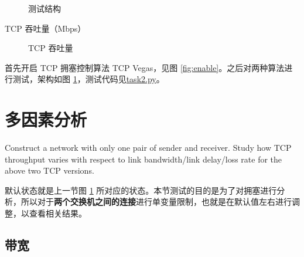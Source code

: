     \noindent
    \begin{minipage}{0.4\textwidth}
        \begin{figure}[H]
            \centering
            
            \caption{测试结构}\label{fig:task2topo}
        \end{figure}
        \begin{table}[H]
            \centering
            \caption{TCP 吞吐量（Mbps）}
        \end{table}
    \end{minipage}
    \begin{minipage}{0.6\textwidth}
        \begin{figure}[H]
            \caption{TCP 吞吐量}
        \end{figure}
    \end{minipage}

    首先开启 TCP 拥塞控制算法 TCP Vegas，见图 \ref{fig:enable}。之后对两种算法进行测试，架构如图 \ref{fig:task2topo}，测试代码见\href{./task2.py}{\ttfamily task2.py}。

    \section{多因素分析}
    Construct a network with only one pair of sender and receiver. Study how TCP throughput varies with respect to link bandwidth/link delay/loss rate for the above two TCP versions.

    默认状态就是上一节图 \ref{fig:task2topo} 所对应的状态。本节测试的目的是为了对拥塞进行分析，所以对于\textbf{两个交换机之间的连接}进行单变量限制，也就是在默认值左右进行调整，以查看相关结果。

    \subsection{带宽}

